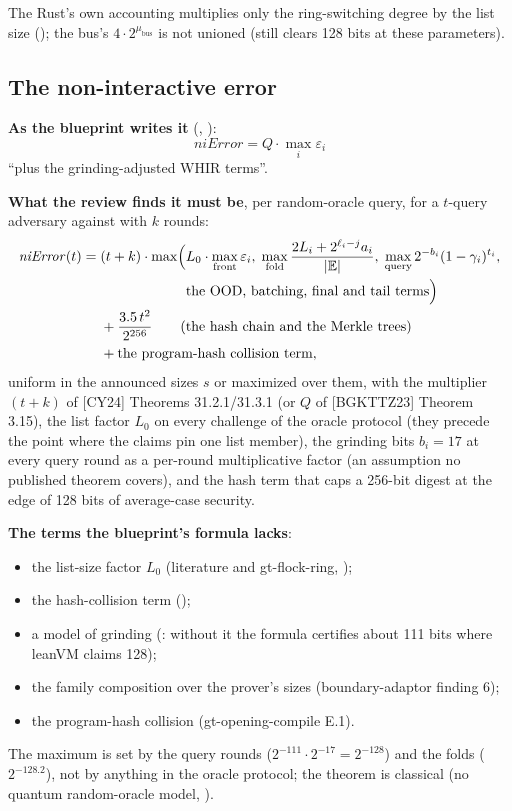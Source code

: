 The Rust's own accounting multiplies only the ring-switching degree by the list size
(); the bus's $4\cdot 2^{\mu_{\mathrm{bus}}}$ is not unioned (still clears 128
bits at these parameters).

\subsection{The non-interactive error}\label{sec:obl-error-ni}

\textbf{As the blueprint writes it} (, ):
\[
  \mathit{niError} = Q \cdot \max_i \varepsilon_i
\]
``plus the grinding-adjusted WHIR terms''.

\textbf{What the review finds it must be}, per random-oracle query, for a $t$-query adversary
against  with $k$ rounds:
\begin{align*}
  \mathit{niError}(t) ={}& (t + k)\cdot\max\Bigl( L_0\cdot\max_{\text{front}}\varepsilon_i,\;
     \max_{\text{fold}}\frac{2L_i + 2^{\ell_i - j}a_i}{\lvert \mathbb{E}\rvert},\;
     \max_{\text{query}} 2^{-b_i}(1 - \gamma_i)^{t_i},\\
  &\hphantom{(t + k)\cdot\max\Bigl(}\text{the OOD, batching, final and tail terms}\Bigr)\\
  &+ \frac{3.5\,t^2}{2^{256}} \qquad \text{(the hash chain and the Merkle trees)}\\
  &+ \text{the program-hash collision term},
\end{align*}
uniform in the announced sizes $s$ or maximized over them, with the multiplier $(t + k)$ of
[CY24] Theorems 31.2.1/31.3.1 (or $Q$ of [BGKTTZ23] Theorem 3.15), the list factor $L_0$ on every
challenge of the oracle protocol (they precede the point where the claims pin one list member),
the grinding bits $b_i = 17$ at every query round as a per-round multiplicative factor (an
assumption no published theorem covers), and the hash term that caps a 256-bit digest at the
edge of 128 bits of average-case security.

\textbf{The terms the blueprint's formula lacks}:
\begin{itemize}
\item the list-size factor $L_0$ (literature and gt-flock-ring, );
\item the hash-collision term ();
\item a model of grinding (: without it the formula certifies about 111 bits where leanVM
  claims 128);
\item the family composition over the prover's sizes (boundary-adaptor finding 6);
\item the program-hash collision (gt-opening-compile E.1).
\end{itemize}
The maximum is set by the query rounds ($2^{-111}\cdot 2^{-17} = 2^{-128}$) and the folds
($2^{-128.2}$), not by anything in the oracle protocol; the theorem is classical (no quantum
random-oracle model, ).

